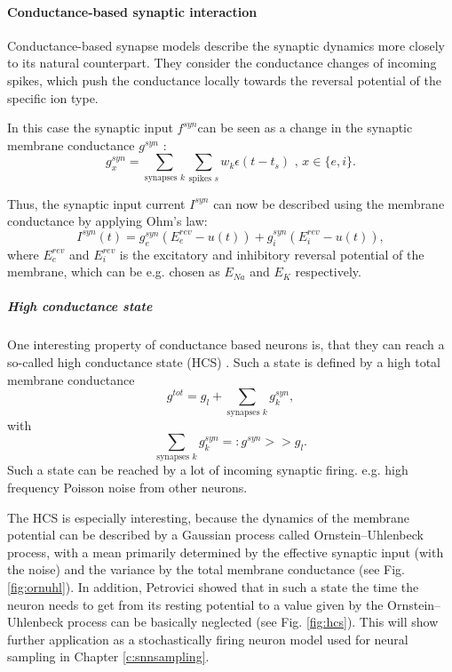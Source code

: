 \paragraph{Conductance-based synaptic interaction} \label{c:coba}
Conductance-based synapse models describe the synaptic dynamics more closely to its natural counterpart. They consider the conductance changes of incoming spikes, which push the conductance locally towards the reversal potential of the specific ion type. 

In this case the synaptic input $f^{syn} $can be seen as a change in the synaptic membrane conductance $g^{syn}$ :
\[
g_x^{syn} = \sum_{\text{synapses } k } \sum_{\text{spikes } s} w_k \epsilon(t - t_s) \text{ ,      } x \in \{e, i\}.
\]

Thus, the synaptic input current $I^{syn}$ can now be described using the membrane conductance by applying Ohm's law:
\[
I^{syn}(t) = g_e^{syn} (E_e^{rev} - u(t)) + g_i^{syn} (E_i^{rev} - u(t)),
\]
where $E_e^{rev}$ and $E_i^{rev}$ is the excitatory and inhibitory reversal potential of the membrane, which can be e.g. chosen as $E_{Na}$ and $E_{K}$ respectively.  

\subparagraph{High conductance state} \label{c:hcs}
One interesting property of conductance based neurons is, that they can reach a so-called high conductance state (HCS) \cite{Petrovici2016}. Such a state is defined by a high total membrane conductance 
\[
g^{tot} = g_l + \sum_{\text{synapses } k} g_k^{syn},
\]
with 
\[
\sum_{\text{synapses } k} g_k^{syn} =: g^{syn} >> g_l .
\]
Such a state can be reached by a lot of incoming synaptic firing. e.g. high frequency Poisson noise from other neurons. 

The HCS is especially interesting, because the dynamics of the membrane potential can be described by a Gaussian process called Ornstein–Uhlenbeck process, with a mean primarily determined by the effective synaptic input (with the noise) and the variance by the total membrane conductance (see Fig. \ref{fig:ornuhl}).
In addition, Petrovici showed that in such a state the time the neuron needs to get from its resting potential to a value given by the Ornstein–Uhlenbeck process can be basically neglected (see Fig. \ref{fig:hcs}).
This will show further application as a stochastically firing neuron model used for neural sampling  in Chapter \ref{c:snnsampling}.

